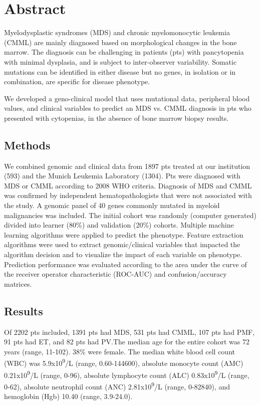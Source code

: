 \section{Abstract}%

Myelodysplastic syndromes (MDS) and chronic myelomonocytic leukemia (CMML) are mainly diagnosed based on morphological changes in the bone marrow. The diagnosis can be challenging in patients (pts) with pancytopenia with minimal dysplasia, and is subject to inter-observer variability. Somatic mutations can be identified in either disease but no genes, in isolation or in combination, are specific for disease phenotype.

We developed a geno-clinical model that uses mutational data, peripheral blood values, and clinical variables to predict an MDS vs. CMML diagnosis in pts who presented with cytopenias, in the absence of bone marrow biopsy results.


\subsection{Methods}%

We combined genomic and clinical data from 1897 pts treated at our institution (593) and the Munich Leukemia Laboratory (1304). Pts were diagnosed with MDS or CMML according to 2008 WHO criteria. Diagnosis of MDS and CMML was confirmed by independent hematopathologists that were not associated with the study. A genomic panel of 40 genes commonly mutated in myeloid malignancies was included. The initial cohort was randomly (computer generated) divided into learner (80\%) and validation (20\%) cohorts. Multiple machine learning algorithms were applied to predict the phenotype. Feature extraction algorithms were used to extract genomic/clinical variables that impacted the algorithm decision and to visualize the impact of each variable on phenotype. Prediction performance was evaluated according to the area under the curve of the receiver operator characteristic (ROC-AUC) and confusion/accuracy matrices.


\subsection{Results}%

Of 2202 pts included, 1391 pts had MDS, 531 pts had CMML, 107 pts had PMF, 91 pts had ET, and 82 pts had PV.The median age for the entire cohort was 72 years (range, 11-102). 38\% were female. The median white blood cell count (WBC) was 5.9x10\textsuperscript{9}/L (range, 0.60-144600), absolute monocyte count (AMC) 0.21x10\textsuperscript{9}/L (range, 0-96), absolute lymphocyte count (ALC) 0.83x10\textsuperscript{9}/L (range, 0-62), absolute neutrophil count (ANC) 2.81x10\textsuperscript{9}/L (range, 0-82840), and hemoglobin (Hgb)  10.40 (range, 3.9-24.0). 

